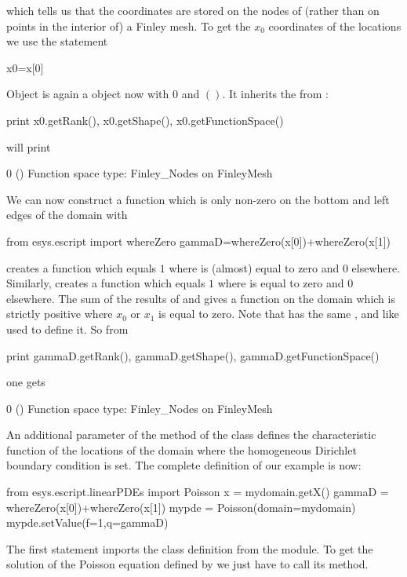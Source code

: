 which tells us that the coordinates are stored on the nodes of (rather than on
points in the interior of) a Finley mesh.
To get the  $x_{0}$ coordinates of the locations we use the statement 
\begin{python}
  x0=x[0]
\end{python}
Object  is again a \Data object now with \Rank $0$ and \Shape $()$.
It inherits the \FunctionSpace from :
\begin{python}
  print x0.getRank(), x0.getShape(), x0.getFunctionSpace()
\end{python}
will print
\begin{python}
  0 () Function space type: Finley_Nodes on FinleyMesh 
\end{python}
We can now construct a function  which is only non-zero on the
bottom and left edges of the domain with
\begin{python}
  from esys.escript import whereZero
  gammaD=whereZero(x[0])+whereZero(x[1])
\end{python}

 creates a function which equals $1$ where  is (almost) equal to zero and $0$ elsewhere. 
Similarly,  creates a function which equals $1$ where  is equal to zero and $0$ elsewhere.
The sum of the results of  and 
gives a function on the domain  which is strictly positive where $x_{0}$ or $x_{1}$ is equal to zero.
Note that  has the same \Rank, \Shape and \FunctionSpace like  used to define it.
So from 
\begin{python}
  print gammaD.getRank(), gammaD.getShape(), gammaD.getFunctionSpace()
\end{python}
one gets 
\begin{python}
  0 () Function space type: Finley_Nodes on FinleyMesh 
\end{python}
An additional parameter  of the  method of the \Poisson
class defines the characteristic function of
the locations of the domain where the homogeneous Dirichlet boundary condition is set.
The complete definition of our example is now:
\begin{python}
  from esys.escript.linearPDEs import Poisson
  x = mydomain.getX()
  gammaD = whereZero(x[0])+whereZero(x[1])
  mypde = Poisson(domain=mydomain)
  mypde.setValue(f=1,q=gammaD)
\end{python}
The first statement imports the \Poisson class definition from the \linearPDEs module.
To get the solution of the Poisson equation defined by  we just have to call its  method. 

